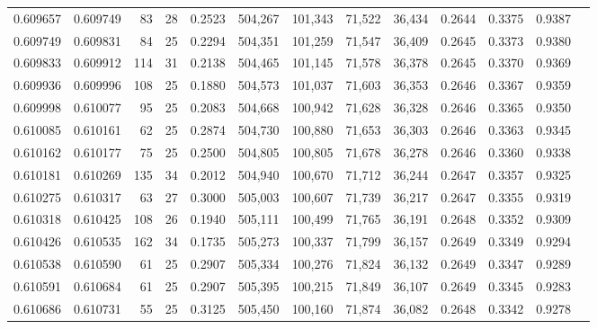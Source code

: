 \begin{tabular}{rrrrrrrrrrrrr}
0.609657 & 0.609749 &  83 &  28 &                                     0.2523 & 504,267 & 101,343 &  71,522 &  36,434 & 0.2644 & 0.3375 & 0.9387 \\
0.609749 & 0.609831 &  84 &  25 &                                     0.2294 & 504,351 & 101,259 &  71,547 &  36,409 & 0.2645 & 0.3373 & 0.9380 \\
0.609833 & 0.609912 & 114 &  31 &                                     0.2138 & 504,465 & 101,145 &  71,578 &  36,378 & 0.2645 & 0.3370 & 0.9369 \\
0.609936 & 0.609996 & 108 &  25 &                                     0.1880 & 504,573 & 101,037 &  71,603 &  36,353 & 0.2646 & 0.3367 & 0.9359 \\
0.609998 & 0.610077 &  95 &  25 &                                     0.2083 & 504,668 & 100,942 &  71,628 &  36,328 & 0.2646 & 0.3365 & 0.9350 \\
0.610085 & 0.610161 &  62 &  25 &                                     0.2874 & 504,730 & 100,880 &  71,653 &  36,303 & 0.2646 & 0.3363 & 0.9345 \\
0.610162 & 0.610177 &  75 &  25 &                                     0.2500 & 504,805 & 100,805 &  71,678 &  36,278 & 0.2646 & 0.3360 & 0.9338 \\
0.610181 & 0.610269 & 135 &  34 &                                     0.2012 & 504,940 & 100,670 &  71,712 &  36,244 & 0.2647 & 0.3357 & 0.9325 \\
0.610275 & 0.610317 &  63 &  27 &                                     0.3000 & 505,003 & 100,607 &  71,739 &  36,217 & 0.2647 & 0.3355 & 0.9319 \\
0.610318 & 0.610425 & 108 &  26 &                                     0.1940 & 505,111 & 100,499 &  71,765 &  36,191 & 0.2648 & 0.3352 & 0.9309 \\
0.610426 & 0.610535 & 162 &  34 &                                     0.1735 & 505,273 & 100,337 &  71,799 &  36,157 & 0.2649 & 0.3349 & 0.9294 \\
0.610538 & 0.610590 &  61 &  25 &                                     0.2907 & 505,334 & 100,276 &  71,824 &  36,132 & 0.2649 & 0.3347 & 0.9289 \\
0.610591 & 0.610684 &  61 &  25 &                                     0.2907 & 505,395 & 100,215 &  71,849 &  36,107 & 0.2649 & 0.3345 & 0.9283 \\
0.610686 & 0.610731 &  55 &  25 &                                     0.3125 & 505,450 & 100,160 &  71,874 &  36,082 & 0.2648 & 0.3342 & 0.9278 \\

\end{tabular}
